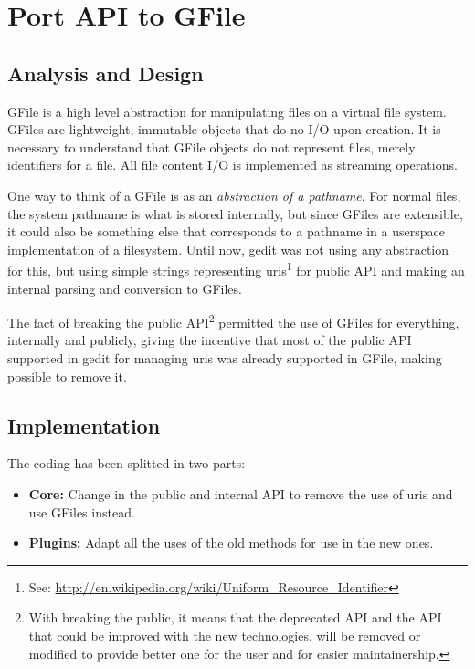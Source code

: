 
\chapter[Port API to GFile]{Port API to GFile}\label{chap:GFile}


\section{Analysis and Design}

GFile is a high level abstraction for manipulating files on a virtual file system. GFiles are lightweight, immutable objects that do no I/O upon creation. It is necessary to understand that GFile objects do not represent files, merely identifiers for a file. All file content I/O is implemented as streaming operations.

One way to think of a GFile is as an \emph{abstraction of a pathname}. For normal files, the system pathname is what is stored internally, but since GFiles are extensible,  it could also be something else that corresponds to a pathname in a userspace implementation of a filesystem\cite{website:gio}.  Until now, gedit was not using any abstraction for this, but using simple strings representing uris\footnote{See: \url{http://en.wikipedia.org/wiki/Uniform_Resource_Identifier}} for public API and making an internal parsing and conversion to GFiles.

The fact of breaking the public API\footnote{With breaking the public, it means that the deprecated API and the API that could be improved with the new technologies, will be removed or modified to provide better one for the user and for easier maintainership.} permitted the use of GFiles for everything, internally and publicly, giving the incentive that most of the public API supported in gedit for managing uris was already supported in GFile, making possible to remove it.

\newpage
\section{Implementation}

The coding has been splitted in two parts:
\begin{itemize}
  \item \textbf{Core:} Change in the public and internal API to remove the use of uris and use GFiles instead.
  \item \textbf{Plugins:} Adapt all the uses of the old methods for use in the new ones.
\end{itemize}

